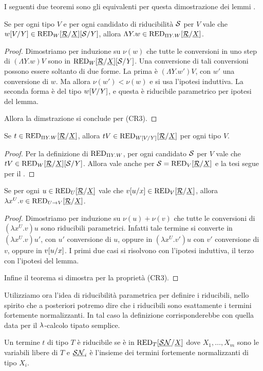 \documentclass[]{marticle}
\begin{document}
I seguenti due teoremi sono gli equivalenti per questa dimostrazione dei lemmi
.
\begin{block} [Lemma]
    Se per ogni tipo $V$ e per ogni candidato di riducibilit\`a $\mathcal{S}$ per
    $V$ vale che $w[V/Y]\in\text{RED}_{W}[\underline{\mathcal{R}}/\underline{X}][\mathcal{S}/Y]$, allora $\Lambda
    Y. w\in\text{RED}_{\Pi Y.W}[\underline{\mathcal{R}}/\underline{X}]$.
\begin{proof}
    Dimostriamo per induzione su $\nu(w)$ che tutte le conversioni in uno step
    di $(\Lambda Y.w)V$ sono in $\text{RED}_{W} [\underline{\mathcal{R}}/\underline{X}][\mathcal{S}/Y]$. Una
    conversione di tali conversioni possono essere soltanto di due forme.  La
    prima \`e $(\Lambda Y.w')V$, con $w'$ una conversione di $w$. Ma allora
    $\nu(w')<\nu(w)$ e si usa l'ipotesi induttiva. La seconda forma \`e del tipo
    $w[V/Y]$, e questa \`e riducibile parametrico per ipotesi del lemma. 

    Allora la dimstrazione si conclude per (CR3).
\end{proof}
\end{block}

\begin{block} [Lemma]
    Se $t\in \text{RED}_{\Pi Y.W}[\underline{\mathcal{R}}/\underline{X}]$, allora $tV\in \text{RED}_{W[V/Y]}[\underline{\mathcal{R}}/\underline{X}]$ per
    ogni tipo $V$.
\begin{proof}
    Per la definizione di $\text{RED}_{\Pi Y.W}$, per ogni candidato $\mathcal{S}$ per $V$
    vale che $tV\in \text{RED}_{W}[\underline{\mathcal{R}}/\underline{X}][\mathcal{S}/Y]$. Allora vale anche per
    $\mathcal{S} = \text{RED}_{V}[\underline{\mathcal{R}}/\underline{X}]$ e la tesi segue per il .
\end{proof}
\end{block}

\begin{block} [Lemma]
    Se per ogni $u\in \text{RED}_{U}[\underline{\mathcal{R}}/\underline{X}]$ vale che $v[u/x] \in \text{RED}_{V}[\underline{\mathcal{R}}/\underline{X}]$,
    allora $\lambda x^U.v\in \text{RED}_{U\rightarrow V}[\underline{\mathcal{R}}/\underline{X}]$.
\begin{proof}
    Dimostriamo per induzione su $\nu(u)+\nu(v)$ che tutte le conversioni di
    $(\lambda x^U.v)u$ sono riducibili parametrici. Infatti tale termine si
    converte in $(\lambda x^U.v)u'$, con $u'$ conversione di $u$, oppure in
    $(\lambda x^U.v')u$ con $v'$ conversione di $v$, oppure in $v[u/x]$. I
    primi due casi si risolvono con l'ipotesi induttiva, il terzo con l'ipotesi
    del lemma.

    Infine il teorema si dimostra per la propriet\`a (CR3).
\end{proof}
\end{block}

Utilizziamo ora l'idea di riducibilit\`a parametrica per definire i riducibili,
nello spirito che a posteriori potremo dire che i riducibili sono esattamente i
termini fortemente normalizzanti. In tal caso la definizione corrisponderebbe
con quella data per il $\lambda$-calcolo tipato semplice.
\begin{block} [Definizione]
    Un termine $t$ di tipo $T$ \`e riducibile se \`e in
    $\text{RED}_{T}[\underline{\mathcal{SN}}/\underline{X}]$ dove $X_1,\dots,X_m$ sono
    le variabili libere di $T$ e $\underline{\mathcal{SN}}_i$ \`e l'insieme dei
    termini fortemente normalizzanti di tipo $X_i$.
\end{block}
\end{document}
